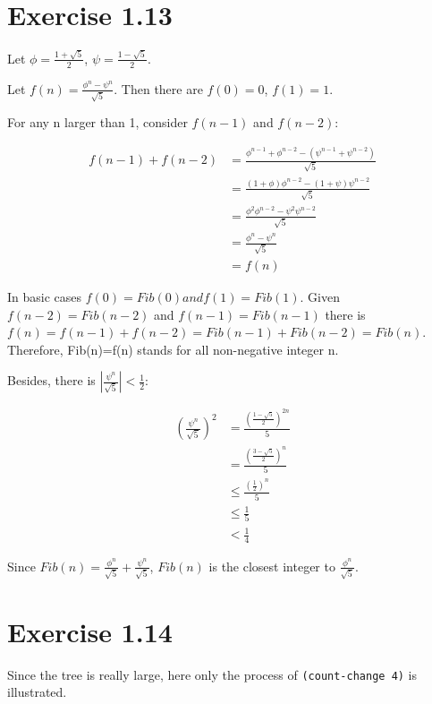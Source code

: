 \documentclass[../main.tex]{subfiles}
\begin{document}
\section{Exercise 1.13}

Let $\phi = \frac{1 + \sqrt{5}}{2}$, $\psi = \frac{1 - \sqrt{5}}{2}$.

Let $f(n) = \frac{\phi ^ n - \psi ^ n}{\sqrt{5}}$. Then there are $f(0) = 0$, $f(1) = 1$.

For any n larger than 1, consider $f(n - 1)$ and $f(n - 2)$:

\begin{align*}
f(n-1) + f(n-2) &= \frac{\phi^{n-1} + \phi^{n-2}-(\psi^{n-1}+\psi^{n-2})}{\sqrt{5}} \\
                &= \frac{(1+\phi)\phi^{n-2}-(1+\psi)\psi^{n-2}}{\sqrt{5}} \\
                &= \frac{\phi^2\phi^{n-2}-\psi^2\psi^{n-2}}{\sqrt{5}} \\
                &= \frac{\phi^n-\psi^n}{\sqrt{5}} \\
                &= f(n)
\end{align*}

In basic cases $f(0)=Fib(0) and f(1)=Fib(1)$. Given $f(n-2)=Fib(n-2)$ and
 $f(n-1)=Fib(n-1)$ there is
 $f(n)=f(n-1)+f(n-2)=Fib(n-1)+Fib(n-2)=Fib(n)$. Therefore, Fib(n)=f(n)
 stands for all non-negative integer n.

Besides, there is $\left|\frac{\psi^n}{\sqrt{5}}\right|<\frac{1}{2}$:

\begin{align*}
\left({\frac{\psi^n}{\sqrt{5}}}\right)^2 &= \frac{\left({\frac{1-\sqrt{5}}{2}}\right)^{2n}}{5} \\
&= \frac{\left({\frac{3-\sqrt{5}}{2}}\right)^{n}}{5} \\
&\leq \frac{\left(\frac{1}{2}\right)^n}{5} \\
&\leq \frac{1}{5} \\
&< \frac{1}{4}
\end{align*}

Since $Fib(n)=\frac{\phi^n}{\sqrt{5}}+\frac{\psi^n}{\sqrt{5}}$, $Fib(n)$ is the closest
 integer to $\frac{\phi^n}{\sqrt{5}}$.

\section{Exercise 1.14}

Since the tree is really large, here only the process of \lstinline{(count-change 4)} is illustrated.
\end{document}

